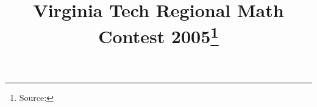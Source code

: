 \documentclass[10pt]{article}
\begin{document}
\title{Virginia Tech Regional Math Contest 2005\footnote{Source: \source}}
\author{\vspace{-2ex}}
\date{\vspace{-6ex}} %
\maketitle







\end{document}
